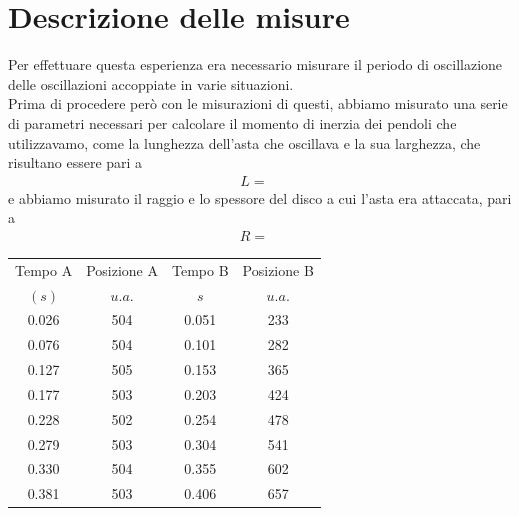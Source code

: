 \documentclass{article}
\begin{document}
\section{Descrizione delle misure}

Per effettuare questa esperienza era necessario misurare il periodo di oscillazione delle oscillazioni accoppiate in varie situazioni. \\
Prima di procedere però con le misurazioni di questi, abbiamo misurato una serie di parametri necessari per calcolare il momento di inerzia dei pendoli che utilizzavamo, come la lunghezza dell'asta che oscillava e la sua larghezza, che risultano essere pari a
\begin{align*}
    &L = & &
\end{align*}
e abbiamo misurato il raggio e lo spessore del disco a cui l'asta era attaccata, pari a
\begin{align*}
    &R = & & 
\end{align*}
\begin{minipage}{0.5\textwidth}
    \centering
    \begin{tabular}{c c c c}
        \toprule
        Tempo A & Posizione A & Tempo B & Posizione B \\
        $(s)$ &  $u.a.$ & $s$ & $u.a.$ \\ \toprule
        0.026 & 504 & 0.051 & 233 \\
        0.076 & 504 & 0.101 & 282 \\
        0.127 & 505 & 0.153 & 365 \\
        0.177 & 503 & 0.203 & 424 \\
        0.228 & 502 & 0.254 & 478 \\
        0.279 & 503 & 0.304 & 541 \\
        0.330 & 504 & 0.355 & 602 \\
        0.381 & 503 & 0.406 & 657 \\ \bottomrule
    \end{tabular}
    \captionsetup{format=plain}
\end{minipage}
\hspace{0.01\textwidth}
\end{document}
